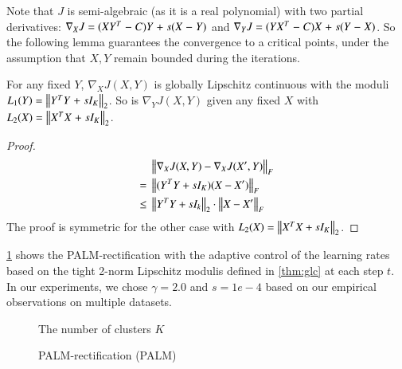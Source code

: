 Note that $J$ is semi\hyp{}algebraic (as it is a real polynomial) with two
partial derivatives: $\nabla_{X}J \mathrel{=} (X Y^T \mathrel{-} C)Y \mathrel{+} s(X\mathrel{-} Y)$ and
$\nabla_{Y}J \mathrel{=} (Y X^T \mathrel{-} C)X \mathrel{+} s(Y \mathrel{-} X)$. So the following lemma
guarantees the convergence to a critical points, under the assumption that $X,
Y$ remain bounded during the iterations.
\begin{lemma}\label{thm:glc}
  For any fixed $Y$, $\nabla_{X}J(X, Y)$ is globally Lipschitz continuous with
  the moduli $L_1(Y) \mathrel{=} \left\lVert Y^T Y \mathrel{+} sI_K\right\rVert_2$. So is $\nabla_{Y}J(X, Y)$
  given any fixed $X$ with $L_2(X) \mathrel{=} \left\lVert X^T X \mathrel{+} sI_K\right\rVert_2$.
\end{lemma}
\begingroup
\allowdisplaybreaks
\begin{proof}
	\begin{align*}
		&\left\lVert\nabla_{X}J(X, Y) - \nabla_{X}J(X', Y)\right\rVert_F \\
		\mathrel{=}{} & \left\lVert(Y^TY + sI_K)(X - X')\right\rVert_F \\
		\leq{} & \left\lVert Y^T Y + sI_k\right\rVert_2 \cdot\left\lVert X - X'\right\rVert_F
	\end{align*} 
	The proof is symmetric for the other case with $L_2(X) = \left\lVert X^TX+ sI_K\right\rVert_2$.
\end{proof}
\endgroup
\cref{alg:palm} shows the PALM\hyp{}rectification with the adaptive control of
the learning rates based on the tight 2\hyp{}norm Lipschitz modulis defined in
\cref{thm:glc} at each step $t$. In our experiments, we chose $\gamma = 2.0$ and
$s=1e-4$ based on our empirical observations on multiple datasets.
\begin{figure}[htbp]
  \begin{algorithm}[H]{}
		\DontPrintSemicolon
		\hspace{28px} The number of clusters $K$\\
		\caption{PALM-rectification (PALM)}
	  \label{alg:palm}      
	\end{algorithm}
\end{figure}
